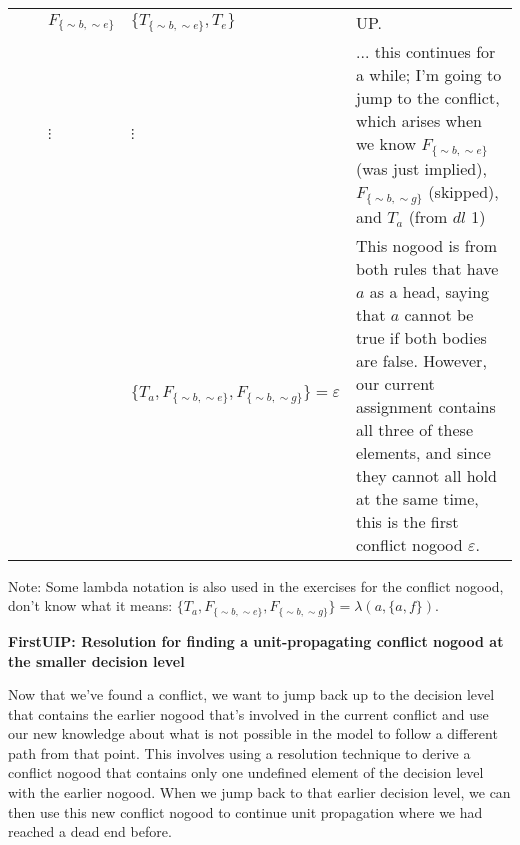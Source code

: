 \documentclass[9pt,a4paper,landscape]{article}
\newcommand{\ngtb}[1]{T_{ \{#1\} }}
\newcommand{\ngfb}[1]{F_{ \{#1\} }}
\newcommand{\ngta}[1]{T_{#1}}
\begin{document}
{\begin{center}
\begin{tabular}{l|ll|l|p{12cm}}
	  &				& $\ngfb{{\sim} b, {\sim} e}$ & $\{ \ngtb{{\sim} b, {\sim} e}, \ngta{e} \}$ & UP. \\
	  &				& $\vdots$ &  $\vdots$ & ... this continues for a while; I'm going to jump to the conflict, which arises when we know $\ngfb{{\sim} b, {\sim} e}$ (was just implied), $\ngfb{{\sim} b, {\sim} g}$ (skipped), and $\ngta{a}$ (from $dl$ 1) \\
	  &				& & $\{ \ngta{a}, \ngfb{{\sim} b, {\sim} e}, \ngfb{{\sim} b, {\sim} g} \} = \varepsilon$ & This nogood is from both rules that have $a$ as a head, saying that $a$ cannot be true if both bodies are false. However, our current assignment contains all three of these elements, and since they cannot all hold at the same time, this is the first conflict nogood $\varepsilon$. \\
\end{tabular}
\end{center}

Note: Some lambda notation is also used in the exercises for the conflict nogood, don't know what it means: $\{ \ngta{a}, \ngfb{{\sim} b, {\sim} e}, \ngfb{{\sim} b, {\sim} g} \} = \lambda(a, \{a, f\})$.










\vspace{\baselineskip}
\textbf{FirstUIP: Resolution for finding a unit-propagating conflict nogood at the smaller decision level}

Now that we've found a conflict, we want to jump back up to the decision level that contains the earlier nogood that's involved in the current conflict and use our new knowledge about what is not possible in the model to follow a different path from that point.
This involves using a resolution technique to derive a conflict nogood that contains only one undefined element of the decision level with the earlier nogood.
When we jump back to that earlier decision level, we can then use this new conflict nogood to continue unit propagation where we had reached a dead end before.

}
\end{document}
